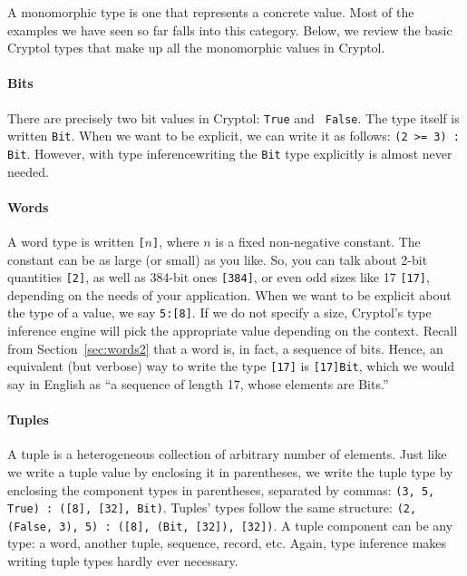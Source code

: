 A monomorphic type is one that represents a concrete value. Most of
the examples we have seen so far falls into this category. Below, we
review the basic Cryptol types that make up all the monomorphic values
in Cryptol.

\paragraph*{Bits}\indTheBitType\indTrue\indFalse There are precisely
two bit values in Cryptol: {\tt True} and {\tt
  False}. The type itself is written {\tt Bit}. When we want to be
explicit, we can write it as follows: {\tt (2 >= 3) : Bit}. However,
with type inference\indTypeInference writing the {\tt Bit} type
explicitly is almost never needed.

\paragraph*{Words}\indTheWordType\indTheBitType A word type is written
{\tt [}$n${\tt ]}, where $n$ is a fixed
non-negative constant. The constant can be as large (or small) as you
like.  So, you can talk about 2-bit quantities {\tt [2]}, as well as
384-bit ones {\tt [384]}, or even odd sizes like 17 {\tt [17]},
depending on the needs of your application. When we want to be
explicit about the type of a value, we say {\tt 5:[8]}. If we do not
specify a size, Cryptol's type inference engine will pick the
appropriate value depending on the context.\indTypeInference
Recall from Section~\ref{sec:words2} that a word is, in fact, a
sequence of bits.  Hence, an equivalent (but verbose) way to write the
type {\tt [17]} is {\tt [17]Bit}, which we would say in English as
``a sequence of length 17, whose elements are Bits.''

\paragraph*{Tuples}\indTheTupleType A tuple is a heterogeneous
collection of arbitrary number of
elements. Just like we write a tuple value by enclosing it in
parentheses, we write the tuple type by enclosing the component types
in parentheses, separated by commas: {\tt (3, 5, True) : ([8], [32],
  Bit)}. Tuples' types follow the same structure: {\tt (2, (False, 3),
  5) : ([8], (Bit, [32]), [32])}.  A tuple component can be any type:
a word, another tuple, sequence, record, etc. Again, type inference
makes writing tuple types hardly ever necessary.\indTypeInference

